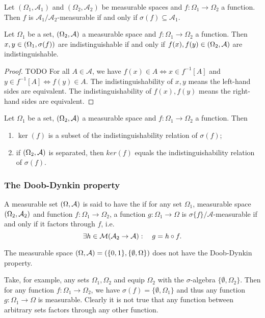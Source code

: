 \begin{lemma}
Let $(\Omega_1, \mathcal{A}_1)$ and $(\Omega_2, \mathcal{A}_2)$ be measurable spaces and $f: \Omega_1\to \Omega_2$ a function. Then $f$ is $\mathcal{A}_1/\mathcal{A}_2$-measurable \textup{if and only if} $\sigma(f) \subseteq \mathcal{A}_1$.
\end{lemma}

\begin{lemma}
Let $\Omega_1$ be a set, $\sSet{\Omega_2, \mathcal{A}}$ a measurable space and $f: \Omega_1\to \Omega_2$ a function. Then $x,y\in \sSet{\Omega_1,\sigma(f)}$ are indistinguishable \textup{if and only if} $f(x), f(y) \in \sSet{\Omega_2,\mathcal{A}}$ are indistinguishable.
\end{lemma}
\begin{proof}
TODO For all $A\in\mathcal{A}$, we have $f(x)\in A \iff x\in f^{-1}[A]$ and $y\in f^{-1}[A]\iff f(y)\in A$. The indistinguishability of $x,y$ means the left-hand sides are equivalent. The indistinguishability of $f(x),f(y)$ means the right-hand sides are equivalent.
\end{proof}
\begin{corollary}
Let $\Omega_1$ be a set, $\sSet{\Omega_2, \mathcal{A}}$ a measurable space and $f: \Omega_1\to \Omega_2$ a function. Then
\begin{enumerate}
\item $\ker(f)$ is a subset of the indistinguishability relation of $\sigma(f)$;
\item if $\sSet{\Omega_2, \mathcal{A}}$ is separated, then $ker(f)$ equals the indistinguishability relation of $\sigma(f)$.
\end{enumerate}
\end{corollary}


\subsubsection{The Doob-Dynkin property}
\begin{definition}
A measurable set $\sSet{\Omega,\mathcal{A}}$ is said to have the  if for any set $\Omega_1$, measurable space $\sSet{\Omega_2,\mathcal{A}_2}$ and function $f: \Omega_1 \to \Omega_2$, a function $g: \Omega_1\to \Omega$ is $\sigma\{f\}/\mathcal{A}$-measurable \textup{if and only if} it factors through $f$, i.e.
\[\exists h\in \operatorname{\mathcal{M}}(\mathcal{A}_2\to \mathcal{A}):\quad g = h\circ f. \]
\end{definition}

\begin{example}
The measurable space $\sSet{\Omega, \mathcal{A}} = \sSet{\{0,1\}, \{\emptyset,\Omega\}}$ does not have the Doob-Dynkin property. 

Take, for example, any sets $\Omega_1, \Omega_2$ and equip $\Omega_2$ with the $\sigma$-algebra $\{\emptyset, \Omega_2\}$. Then for any function $f:\Omega_1 \to \Omega_2$, we have $\sigma(f) = \{\emptyset, \Omega_1\}$ and thus any function $g: \Omega_1 \to \Omega$ is measurable. Clearly it is not true that any function between arbitrary sets factors through any other function.
\end{example}


